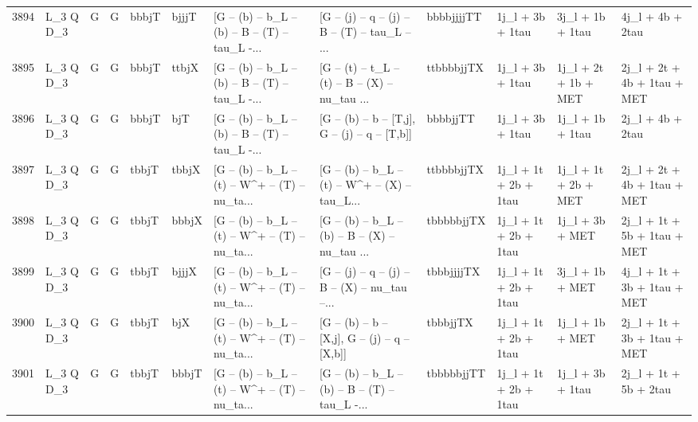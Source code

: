 \begin{tabular}{llllllllllll}
3894 &    L\_3 Q D\_3 &     G &     G &       bbbjT &       bjjjT &  [G -- (b) -- b\_L -- (b) -- B -- (T) -- tau\_L -... &  [G -- (j) -- q -- (j) -- B -- (T) -- tau\_L -- ... &  bbbbjjjjTT &         1j\_l + 3b + 1tau &         3j\_l + 1b + 1tau &                   4j\_l + 4b + 2tau \\
3895 &    L\_3 Q D\_3 &     G &     G &       bbbjT &       ttbjX &  [G -- (b) -- b\_L -- (b) -- B -- (T) -- tau\_L -... &  [G -- (t) -- t\_L -- (t) -- B -- (X) -- nu\_tau ... &  ttbbbbjjTX &         1j\_l + 3b + 1tau &     1j\_l + 2t + 1b + MET &        2j\_l + 2t + 4b + 1tau + MET \\
3896 &    L\_3 Q D\_3 &     G &     G &       bbbjT &         bjT &  [G -- (b) -- b\_L -- (b) -- B -- (T) -- tau\_L -... &   [G -- (b) -- b -- [T,j], G -- (j) -- q -- [T,b]] &    bbbbjjTT &         1j\_l + 3b + 1tau &         1j\_l + 1b + 1tau &                   2j\_l + 4b + 2tau \\
3897 &    L\_3 Q D\_3 &     G &     G &       tbbjT &       tbbjX &  [G -- (b) -- b\_L -- (t) -- W\textasciicircum + -- (T) -- nu\_ta... &  [G -- (b) -- b\_L -- (t) -- W\textasciicircum + -- (X) -- tau\_L... &  ttbbbbjjTX &    1j\_l + 1t + 2b + 1tau &     1j\_l + 1t + 2b + MET &        2j\_l + 2t + 4b + 1tau + MET \\
3898 &    L\_3 Q D\_3 &     G &     G &       tbbjT &       bbbjX &  [G -- (b) -- b\_L -- (t) -- W\textasciicircum + -- (T) -- nu\_ta... &  [G -- (b) -- b\_L -- (b) -- B -- (X) -- nu\_tau ... &  tbbbbbjjTX &    1j\_l + 1t + 2b + 1tau &          1j\_l + 3b + MET &        2j\_l + 1t + 5b + 1tau + MET \\
3899 &    L\_3 Q D\_3 &     G &     G &       tbbjT &       bjjjX &  [G -- (b) -- b\_L -- (t) -- W\textasciicircum + -- (T) -- nu\_ta... &  [G -- (j) -- q -- (j) -- B -- (X) -- nu\_tau --... &  tbbbjjjjTX &    1j\_l + 1t + 2b + 1tau &          3j\_l + 1b + MET &        4j\_l + 1t + 3b + 1tau + MET \\
3900 &    L\_3 Q D\_3 &     G &     G &       tbbjT &         bjX &  [G -- (b) -- b\_L -- (t) -- W\textasciicircum + -- (T) -- nu\_ta... &   [G -- (b) -- b -- [X,j], G -- (j) -- q -- [X,b]] &    tbbbjjTX &    1j\_l + 1t + 2b + 1tau &          1j\_l + 1b + MET &        2j\_l + 1t + 3b + 1tau + MET \\
3901 &    L\_3 Q D\_3 &     G &     G &       tbbjT &       bbbjT &  [G -- (b) -- b\_L -- (t) -- W\textasciicircum + -- (T) -- nu\_ta... &  [G -- (b) -- b\_L -- (b) -- B -- (T) -- tau\_L -... &  tbbbbbjjTT &    1j\_l + 1t + 2b + 1tau &         1j\_l + 3b + 1tau &              2j\_l + 1t + 5b + 2tau \\

\end{tabular}

